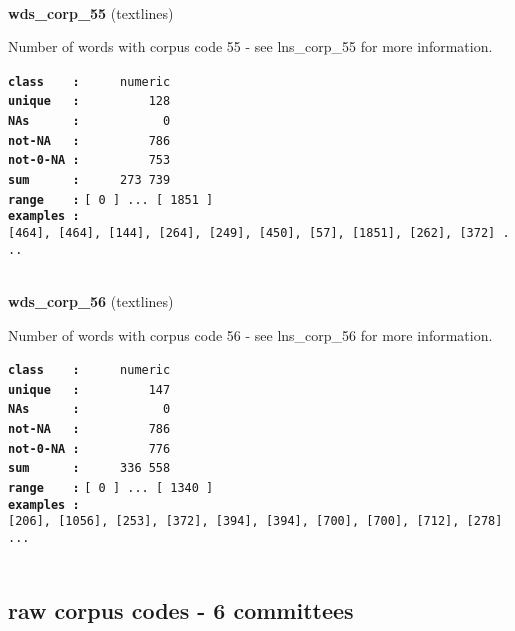 \documentclass[]{article}
\begin{document}
~

\textbf{wds\_corp\_55} (textlines)

Number of words with corpus code 55 - see lns\_corp\_55 for more
information.

\textbf{\texttt{class\ \ \ \ :}} \texttt{~~~~~numeric}\\
\textbf{\texttt{unique\ \ \ :}} \texttt{~~~~~~~~~128}\\
\textbf{\texttt{NAs\ \ \ \ \ \ :}} \texttt{~~~~~~~~~~~0}\\
\textbf{\texttt{not-NA\ \ \ :}} \texttt{~~~~~~~~~786}\\
\textbf{\texttt{not-0-NA\ :}} \texttt{~~~~~~~~~753}\\
\textbf{\texttt{sum\ \ \ \ \ \ :}} \texttt{~~~~~273~739}\\
\textbf{\texttt{range\ \ \ \ :}}
\texttt{{[}\ 0\ {]}\ ...\ {[}\ 1851\ {]}}\\
\textbf{\texttt{examples\ :}}
\texttt{{[}464{]},\ {[}464{]},\ {[}144{]},\ {[}264{]},\ {[}249{]},\ {[}450{]},\ {[}57{]},\ {[}1851{]},\ {[}262{]},\ {[}372{]}\ ...}\\

~

\textbf{wds\_corp\_56} (textlines)

Number of words with corpus code 56 - see lns\_corp\_56 for more
information.

\textbf{\texttt{class\ \ \ \ :}} \texttt{~~~~~numeric}\\
\textbf{\texttt{unique\ \ \ :}} \texttt{~~~~~~~~~147}\\
\textbf{\texttt{NAs\ \ \ \ \ \ :}} \texttt{~~~~~~~~~~~0}\\
\textbf{\texttt{not-NA\ \ \ :}} \texttt{~~~~~~~~~786}\\
\textbf{\texttt{not-0-NA\ :}} \texttt{~~~~~~~~~776}\\
\textbf{\texttt{sum\ \ \ \ \ \ :}} \texttt{~~~~~336~558}\\
\textbf{\texttt{range\ \ \ \ :}}
\texttt{{[}\ 0\ {]}\ ...\ {[}\ 1340\ {]}}\\
\textbf{\texttt{examples\ :}}
\texttt{{[}206{]},\ {[}1056{]},\ {[}253{]},\ {[}372{]},\ {[}394{]},\ {[}394{]},\ {[}700{]},\ {[}700{]},\ {[}712{]},\ {[}278{]}\ ...}\\

~

\subsection{raw corpus codes - 6
committees}\label{raw-corpus-codes---6-committees}
\end{document}
